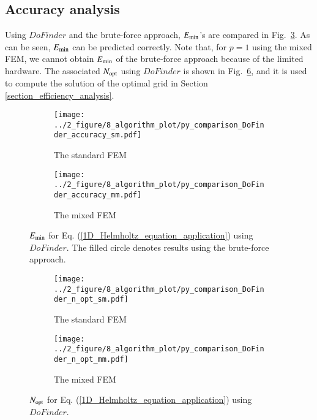 \documentclass[review,3p]{elsarticle}
\begin{document}
\subsection{Accuracy analysis}					\label{section_accuracy_analysis}
Using $DoFinder$ and the brute-force approach, $E_{\rm min}$'s are compared in Fig.~\ref{E_min_application}. As can be seen, $E_{\rm min}$ can be predicted correctly. Note that, for $p=1$ using the mixed FEM, we cannot obtain $E_{\rm min}$ of the brute-force approach because of the limited hardware. The associated $N_{\rm opt}$ using $DoFinder$ is shown in Fig.~\ref{N_opt_application}, and it is used to compute the solution of the optimal grid in Section \ref{section_efficiency_analysis}.

\begin{figure}[!ht]
	\centering
    \begin{subfigure}{6.0cm}
        \texttt{[image: ../2\_figure/8\_algorithm\_plot/py\_comparison\_DoFinder\_accuracy\_sm.pdf]}
        \caption{The standard FEM}
        \label{E_min_application_sm}
    \end{subfigure}
    \begin{subfigure}{6.0cm}	                		 	
        \texttt{[image: ../2\_figure/8\_algorithm\_plot/py\_comparison\_DoFinder\_accuracy\_mm.pdf]}
        \caption{The mixed FEM}
        \label{E_min_application_mm}
    \end{subfigure}
\caption{$E_{\rm min}$ for Eq. (\ref{1D_Helmholtz_equation_application}) using $DoFinder$. The filled circle denotes results using the brute-force approach.}
\label{E_min_application}
\end{figure}

\begin{figure}[!ht]
	\centering
    \begin{subfigure}{6.0cm}
        \texttt{[image: ../2\_figure/8\_algorithm\_plot/py\_comparison\_DoFinder\_n\_opt\_sm.pdf]}
        \caption{The standard FEM}
        \label{N_opt_application_sm}
    \end{subfigure}
    \begin{subfigure}{6.0cm}	                		 	
        \texttt{[image: ../2\_figure/8\_algorithm\_plot/py\_comparison\_DoFinder\_n\_opt\_mm.pdf]}
        \caption{The mixed FEM}
        \label{N_opt_application_mm}
    \end{subfigure}
\caption{$N_{\rm opt}$ for Eq. (\ref{1D_Helmholtz_equation_application}) using $DoFinder$.}
\label{N_opt_application}
\end{figure}
\end{document}
